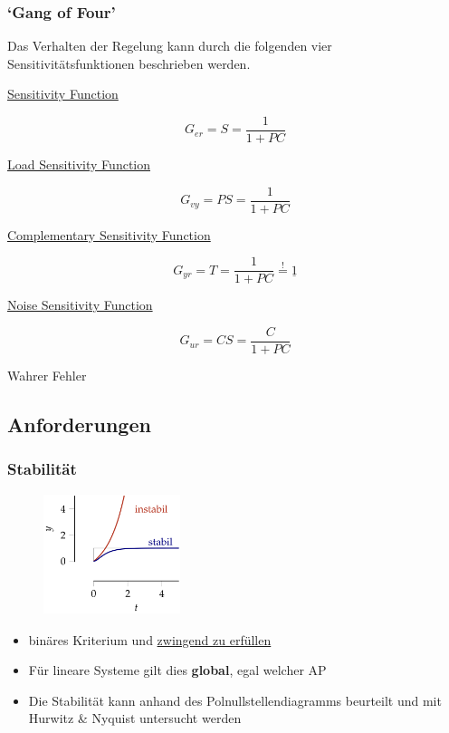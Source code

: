 \documentclass[
  10pt,
  a4paper,
]{article}
\providecommand{\tightlist}{%
  \setlength{\itemsep}{0pt}\setlength{\parskip}{0pt}}\usepackage{longtable,booktabs,array}
\numberwithin{equation}{section}
\begin{document}
\begin{multicols}{2}
\hypertarget{gang-of-four}{%
\subsubsection{`Gang of Four'}\label{gang-of-four}}

Das Verhalten der Regelung kann durch die folgenden vier
Sensitivitätsfunktionen beschrieben werden.

\underline{\footnotesize{Sensitivity Function}}

\[
G_{er} = S = \frac1{1+PC} 
\]

\underline{\footnotesize{Load Sensitivity Function}}

\[
G_{vy} = PS = \frac1{1+PC} 
\]

\underline{\footnotesize{Complementary Sensitivity Function}}

\[
G_{yr} = T = \frac1{1+PC} \stackrel{!}{=} \underline{1}
\]

\underline{\footnotesize{Noise Sensitivity Function}}

\[
G_{ur} = CS = \frac{C}{1+PC} 
\]

Wahrer Fehler

\hypertarget{anforderungen}{%
\subsection{Anforderungen}\label{anforderungen}}

\hypertarget{stabilituxe4t}{%
\subsubsection{Stabilität}\label{stabilituxe4t}}

\begin{figure}[H]

{\centering \includegraphics[width=4cm,height=3.5cm]{images/paste-11.png}

}

\end{figure}

\begin{itemize}
\tightlist
\item
  binäres Kriterium und \ul{zwingend zu erfüllen}
\item
  Für lineare Systeme gilt dies \textbf{global}, egal welcher AP
\item
  Die Stabilität kann anhand des Polnullstellendiagramms beurteilt und
  mit Hurwitz \& Nyquist untersucht werden
\end{itemize}


\end{multicols}
\end{document}
